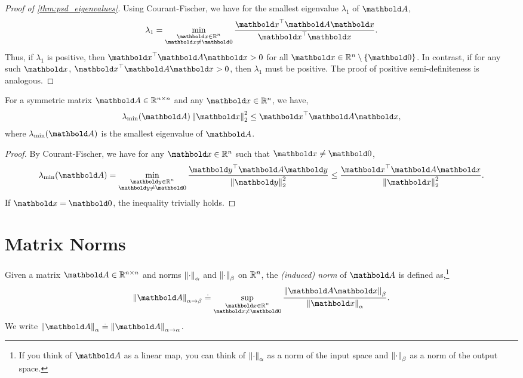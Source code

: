 \begin{proof}[Proof of \cref{thm:psd_eigenvalues}] Using Courant-Fischer, we have for the smallest eigenvalue $\lambda_1$ of $\mA$, \begin{align*}
    \lambda_1 = \min_{\substack{\vx \in \R^n \\ \vx \neq \vZero}} \frac{\trans{\vx}\mA\vx}{\trans{\vx}\vx}.
\end{align*} Thus, if $\lambda_1$ is positive, then $\trans{\vx}\mA\vx > 0$ for all $\vx \in \R^n \setminus \{\vZero\}$. In contrast, if for any such $\vx$, $\trans{\vx}\mA\vx > 0$, then $\lambda_1$ must be positive. The proof of positive semi-definiteness is analogous.
\end{proof}

\begin{cor}\label{lem:quadratic_form_lower_bound}
    For a symmetric matrix $\mA \in \R^{n \times n}$ and any $\vx \in \R^n$, we have, \begin{align}
        \lambda_{\min}(\mA) \norm{\vx}_2^2 \leq \trans{\vx}\mA\vx,
    \end{align} where $\lambda_{\min}(\mA)$ is the smallest eigenvalue of $\mA$.
\end{cor}
\begin{proof}
By Courant-Fischer, we have for any $\vx \in \R^n$ such that $\vx \neq \vZero$, \begin{align*}
    \lambda_{\min}(\mA) = \min_{\substack{\vy \in \R^n \\ \vy \neq \vZero}} \frac{\trans{\vy}\mA\vy}{\norm{\vy}_2^2} \leq \frac{\trans{\vx}\mA\vx}{\norm{\vx}_2^2}.
\end{align*} If $\vx = \vZero$, the inequality trivially holds.
\end{proof}

\section{Matrix Norms}

\begin{defn} Given a matrix $\mA \in \R^{n \times n}$ and norms $\left\| \cdot \right\|_\alpha$ and $\left\| \cdot \right\|_\beta$ on $\mathbb{R}^n$, the \emph{(induced) norm} of $\mA$ is defined as,\footnote{If you think of $\mA$ as a linear map, you can think of $\left\| \cdot \right\|_\alpha$ as a norm of the input space and $\left\| \cdot \right\|_\beta$ as a norm of the output space.} \begin{align}
    \norm{\mA}_{\alpha\to\beta} \defeq \sup_{\substack{\vx \in \R^n \\ \vx \neq \vZero}} \frac{\norm{\mA\vx}_\beta}{\norm{\vx}_\alpha}.
\end{align} We write $\norm{\mA}_\alpha \defeq \norm{\mA}_{\alpha\to\alpha}$.
\end{defn}

